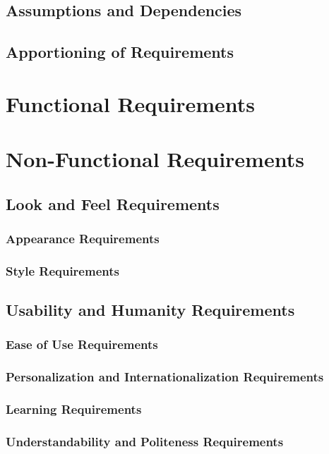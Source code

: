 \documentclass[12pt, titlepage]{article}
\begin{document}
  \subsection{Assumptions and Dependencies}
  \subsection{Apportioning of Requirements}

\section{Functional Requirements}

\section{Non-Functional Requirements}

  \subsection {Look and Feel Requirements}

    \subsubsection{Appearance Requirements}
    \subsubsection{Style Requirements}

  \subsection{Usability and Humanity Requirements}

    \subsubsection{Ease of Use Requirements}
    \subsubsection{Personalization and Internationalization Requirements}
    \subsubsection{Learning Requirements}
    \subsubsection{Understandability and Politeness Requirements}
\end{document}
